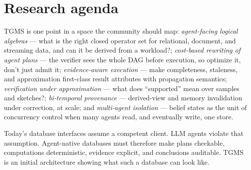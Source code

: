 \documentclass[sigconf]{acmart}
\begin{document}
\section{Research agenda}
\label{sec:agenda}

TGMS is one point in a space the community should map:
\emph{agent-facing logical algebras} --- what is the right closed
operator set for relational, document, and streaming data, and can it be
derived from a workload?; \emph{cost-based rewriting of agent plans} ---
the verifier sees the whole DAG before execution, so optimize it,
don't just admit it; \emph{evidence-aware execution} --- make
completeness, staleness, and approximation first-class result
attributes with propagation semantics; \emph{verification under
approximation} --- what does ``supported'' mean over samples and
sketches?; \emph{bi-temporal provenance} --- derived-view and
memory invalidation under correction, at scale; and \emph{multi-agent
isolation} --- belief states as the unit of concurrency control when
many agents read, and eventually write, one store.

\medskip
\noindent Today's database interfaces assume a competent client. LLM
agents violate that assumption. Agent-native databases must therefore
make plans checkable, computations deterministic, evidence explicit, and
conclusions auditable. TGMS is an initial architecture showing what such
a database can look like.



\end{document}
